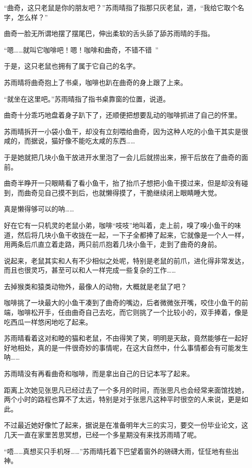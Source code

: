 “曲奇，这只老鼠是你的朋友吧？”苏雨晴指了指那只灰老鼠，道，“我给它取个名字，怎么样？”

曲奇一脸无所谓地摆了摆尾巴，伸出柔软的舌头舔了舔苏雨晴的手指。

“嗯……就叫它咖啡吧！嗯！咖啡和曲奇，不错不错~”

于是，这只老鼠也拥有了属于它自己的名字。

苏雨晴将曲奇抱上了书桌，咖啡也趴在曲奇的身上跟了上来。

“就坐在这里吧。”苏雨晴指了指书桌靠窗的位置，说道。

曲奇十分乖巧地盘着身子趴下了，还顺便把想要乱动的咖啡抓进了自己的怀里。

苏雨晴拆开一小袋小鱼干，却没有立刻喂给曲奇，因为这种人吃的小鱼干其实是很咸的，而据说，猫好像不能吃太咸的东西……

于是她就把几块小鱼干放进开水里泡了一会儿后就捞出来，擦干后放在了曲奇的面前。

曲奇半睁开一只眼睛看了看小鱼干，抬了抬爪子想把小鱼干摸过来，但是却没有碰到，而曲奇见自己摸不到后，也就懒得摸了，干脆继续闭上眼睛睡大觉。

真是懒得够可以的呐……

好在它有一只机灵的老鼠小弟，咖啡“吱吱”地叫着，走上前，嗅了嗅小鱼干的味道，然后将几块小鱼干收拢在一起，一下子全都捧了起来，它就像是一个人一样，用两条后爪直立着走路，两只前爪抱着几块小鱼干，走到了曲奇的身前。

说起来，老鼠其实和人有不少相似之处呢，特别是老鼠的前爪，进化得非常发达，而且也很灵巧，甚至可以和人一样完成一些复杂的工作……

去掉猴类和猿类动物外，最像人的动物，大概就是老鼠了吧？

咖啡挑了一块最大的小鱼干凑到了曲奇的嘴边，后者微微张开嘴，咬住小鱼干的前端，咖啡松开手，任由曲奇自己去吃，而它则挑了一个比较小的，双手捧着，像是吃西瓜一样悠闲地吃了起来。

苏雨晴看着这对和睦的猫和老鼠，不由得笑了笑，明明是天敌，竟然能够在一起好好地相处，真的是一件很奇妙的事情呢，在这大自然中，什么事情都会有可能发生呐……

苏雨晴没有再看曲奇和咖啡，而是拿出自己的日记本写了起来。

距离上次她见张思凡已经过去了一个多月的时间，而张思凡也会经常来面馆找她，两个小时的路程也算不了太远，特别是对于张思凡这种平时很空的人来说，更是如此。

不过最近她好像忙了起来，据说是在准备明年大三的实习，要交一份毕业论文，这几天一直在家里苦思冥想，已经一个多星期没有来找苏雨晴了呢。

“唔……真想买只手机呀……”苏雨晴托着下巴望着窗外的磅礴大雨，怔怔地有些出神。

